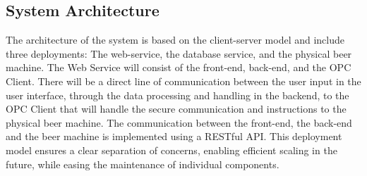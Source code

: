 \subsection{System Architecture}
The architecture of the system is based on the client-server model and include three deployments: The web-service, the database service, and the physical beer machine. \newline
The Web Service will consist of the front-end, back-end, and the OPC Client. There will be a direct line of communication between the user input in the user interface, through the data processing and handling in the backend, to the OPC Client that will handle the secure communication and instructions to the physical beer machine. \newline
The communication between the front-end, the back-end and the beer machine is implemented using a RESTful API. \newline
This deployment model ensures a clear separation of concerns, enabling efficient scaling in the future, while easing the maintenance of individual components.

